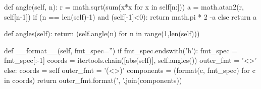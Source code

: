 \begin{python}
def angle(self, n):
    r = math.sqrt(sum(x*x for x in self[n:]))
    a = math.atan2(r, self[n-1])
    if (n == len(self)-1) and (self[-1]<0):
        return math.pi * 2 -a
    else
        return a

def angles(self):
    return (self.angle(n) for n in range(1,len(self)))

def __format__(self, fmt_spec='')
    if fmt_spec.endswith('h'):
        fmt_spec = fmt_spec[:-1]
        coords = itertools.chain([abs(self)], self.angles())
        outer_fmt = '<{}>'
    else:
        coords = self
        outer_fmt = '(<>)'
    components = (format(c, fmt_spec) for c in coords)
    return outer_fmt.format(', '.join(components))
\end{python}

\newpage